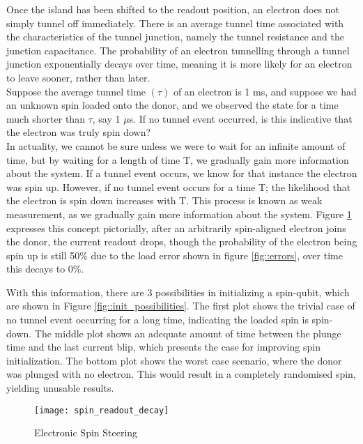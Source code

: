 	Once the island has been shifted to the readout position, an electron does not simply tunnel off immediately. There is an average tunnel time associated with the characteristics of the tunnel junction, namely the tunnel resistance and the junction capacitance. The probability of an electron tunnelling through a tunnel junction exponentially decays over time, meaning it is more likely for an electron to leave sooner, rather than later. \\
	
	Suppose the average tunnel time $(\tau)$ of an electron is 1 ms, and suppose we had an unknown spin loaded onto the donor, and we observed the state for a time much shorter than $\tau$, say 1 $\mu$s. If no tunnel event occurred, is this indicative that the electron was truly spin down? \\
	In actuality, we cannot be sure unless we were to wait for an infinite amount of time, but by waiting for a length of time T, we gradually gain more information about the system. If a tunnel event occurs, we know for that instance the electron was spin up. However, if no tunnel event occurs for a time T; the likelihood that the electron is spin down increases with T. This process is known as weak measurement, as we gradually gain more information about the system. Figure \ref{fig::spin_readout_decay} expresses this concept pictorially, after an arbitrarily spin-aligned electron joins the donor, the current readout drops, though the probability of the electron being spin up is still 50\% due to the load error shown in figure \ref{fig::errors}, over time this decays to 0\%. 
	
	With this information, there are 3 possibilities in initializing a spin-qubit, which are shown in Figure \ref{fig::init_possibilities}. The first plot shows the trivial case of no tunnel event occurring for a long time, indicating the loaded spin is spin-down. The middle plot shows an adequate amount of time between the plunge time and the last current blip, which presents the case for improving spin initialization. The bottom plot shows the worst case scenario, where the donor was plunged with no electron. This would result in a completely randomised spin, yielding unusable results. 
	
	\begin{figure}[htbp!]
		\centering
		\texttt{[image: spin\_readout\_decay]}
		\caption{Electronic Spin Steering}
		\label{fig::spin_readout_decay}
	\end{figure}
	
